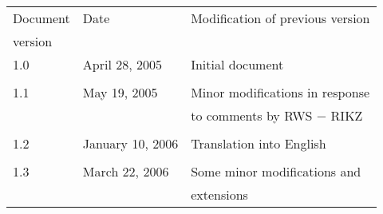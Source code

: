 \documentclass[12pt]{book}
\begin{document}
\backmatter{}


\begin{table}[htb]
\begin{tabular}{l l l}
\hline
  Document & Date             & Modification of previous version \\
  version  &                  &                                  \\
\hline
   1.0     & April 28, 2005   & Initial document                 \\
           &                  &                                  \\
   1.1     & May 19, 2005     & Minor modifications in response  \\
           &                  & to comments by RWS $-$ RIKZ      \\
           &                  &                                  \\
   1.2     & January 10, 2006 & Translation into English         \\
           &                  &                                  \\
   1.3     & March 22, 2006   & Some minor modifications and     \\
           &                  & extensions                       \\
\hline
\end{tabular}
\end{table}
\end{document}
